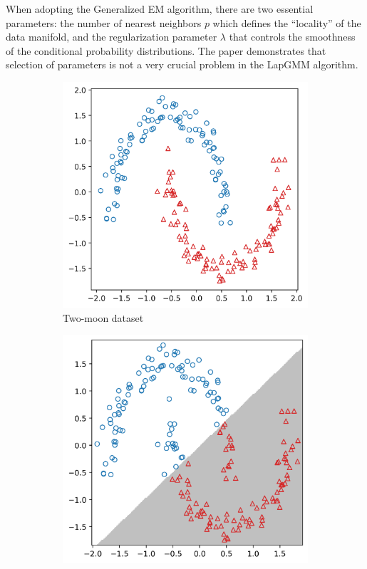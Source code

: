 \documentclass[10pt,journal,compsoc]{IEEEtran}
\begin{document}
    When adopting the Generalized EM algorithm, there are two essential parameters: the number of nearest neighbors $p$ which defines the “locality” of the data manifold, and the regularization parameter $\lambda$ that controls the smoothness of the conditional probability distributions. The paper \cite{he2010laplacian} demonstrates that selection of parameters is not a very crucial problem in the LapGMM algorithm.

    \begin{figure}[!t]
           
        \begin{subfigure}{.33\textwidth}
            \centering
            \includegraphics[width=\linewidth]{figures/data.png}  
            \caption{Two-moon dataset}
            \label{fig:data}
        \end{subfigure}
        \begin{subfigure}{.33\textwidth}
            \centering
            \includegraphics[width=0.98\linewidth]{figures/kmeans.png}  

\end{subfigure}
\end{figure}
\end{document}
